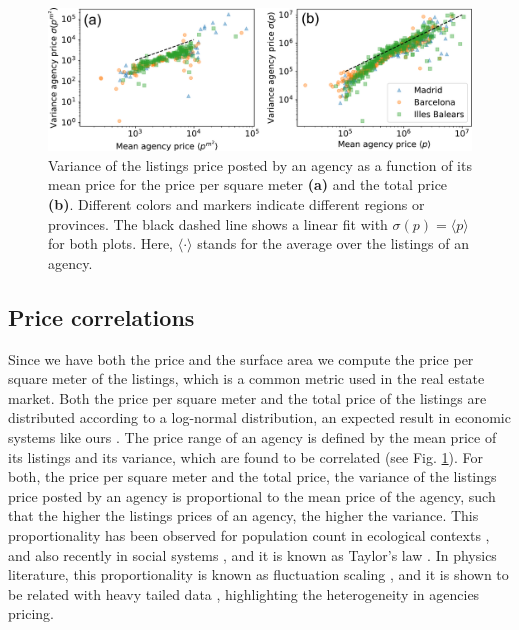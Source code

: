 \begin{figure}
    \centering
    \includegraphics[width =\textwidth]{Figs/Idealista_dynamics/labeled_sigma_price.pdf}
	\caption[Variance of the agency price vs mean agency price.]{Variance of the listings price posted by an agency as a function of its mean price for the price per square meter \textbf{(a)} and the total price \textbf{(b)}. Different colors and markers indicate different regions or provinces. The black dashed line shows a linear fit with $\sigma(p) = \langle p \rangle$ for both plots. Here, $\langle \cdot \rangle$ stands for the average over the listings of an agency. \label{fig:sigma_price}}
\end{figure}

\subsection{Price correlations}

Since we have both the price and the surface area we compute the price per square meter of the listings, which is a common metric used in the real estate market. Both the price per square meter and the total price of the listings are distributed according to a log-normal distribution, an expected result in economic systems like ours \cite{ibragimov2015heavy}. The price range of an agency is defined by the mean price of its listings and its variance, which are found to be correlated (see Fig. \ref{fig:sigma_price}). For both, the price per square meter and the total price, the variance of the listings price posted by an agency is proportional to the mean price of the agency, such that the higher the listings prices of an agency, the higher the variance. This proportionality has been observed for population count in ecological contexts \cite{anderson1982variability, kilpatrick2003species}, and also recently in social systems \cite{chen2020scaling}, and it is known as Taylor's law \cite{taylor1961aggregation,eisler2008fluctuation}. In physics literature, this proportionality is known as fluctuation scaling \cite{eisler2008fluctuation}, and it is shown to be related with heavy tailed data \cite{brown2021taylor}, highlighting the heterogeneity in agencies pricing.

